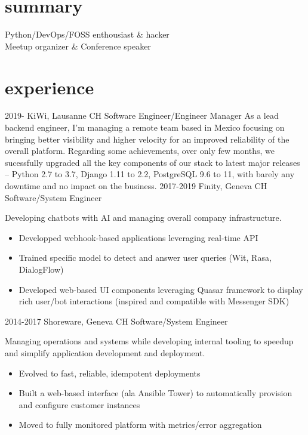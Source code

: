 \documentclass[]{friggeri}
\begin{document}
\section{summary}

Python/DevOps/\ac{FOSS} enthousiast \& hacker\\
Meetup organizer \& Conference speaker

\section{experience}

\begin{entrylist}
  \entry
    {2019-}
    {KiWi, Lausanne CH}
    {Software Engineer/Engineer Manager}
    {As a lead backend engineer, I'm managing a remote team based in Mexico focusing
     on bringing better visibility and higher velocity for an improved reliability
     of the overall platform. Regarding some achievements, over only few months,
     we sucessfully upgraded all the key components of our stack to latest major
     releases – Python 2.7 to 3.7, Django 1.11 to 2.2, PostgreSQL 9.6 to 11, with
     barely any downtime and no impact on the business.}
  \entry
    {2017-2019}
    {Finity, Geneva CH}
    {Software/System Engineer}
    {Developing chatbots with \ac{AI} and managing overall company infrastructure.
    \begin{itemize}
    \item Developped webhook-based applications leveraging real-time \ac{API}
    \item Trained specific model to detect and answer user queries
        (Wit, Rasa, DialogFlow)
    \item Developed web-based UI components leveraging Quasar framework to display
        rich user/bot interactions (inspired and compatible with
        Messenger \ac{SDK})
    \end{itemize}}
  \entry
    {2014-2017}
    {Shoreware, Geneva CH}
    {Software/System Engineer}
    {Managing operations and systems while developing internal tooling to speedup
     and simplify application development and deployment.
    \begin{itemize}
    \item Evolved to fast, reliable, idempotent deployments
    \item Built a web-based interface (ala Ansible Tower) to automatically
        provision and configure customer instances
    \item Moved to fully monitored platform with metrics/error aggregation

\end{itemize}}
\end{entrylist}
\end{document}
